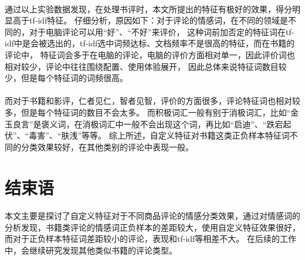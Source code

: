 \documentclass[a4paper,12pt]{article}
\begin{document}
\begin{CJK}{UTF8}{gbsn}
\begin{CJK}{UTF8}{gbsn}
\paragraph{}
通过以上实验数据发现，在处理书评时，本文所提出的特征有极好的效果，得分明显高于tf-idf特征。
仔细分析，原因如下：对于评论的情感词，在不同的领域是不同的，对于电脑评论可以用“好”、“不好”来评价，
这种词前加否定的特征词在tf-idf中是会被选出的，tf-idf选中词频达标、文档频率不是很高的特征，而在书籍的评论中，
特征词会多于在电脑的评论，电脑的评价方面相对单一，因此评价词也相对较少，评论中往往围绕配置、使用体验展开，
因此总体来说特征词数目较少，但是每个特征词的词频很高。
\paragraph{}
而对于书籍和影评，仁者见仁，智者见智，评价的方面很多，评论特征词也相对较多，但是每个特征词的数目不会太多。
而积极词汇一般有别于消极词汇，比如“金玉良言”是褒义词，在消极词汇中一般不会出现这个词，再比如“启迪”、“跌宕起伏”、“毒害”、“肤浅”等等。
综上所述，自定义特征对书籍这类正负样本特征词不同的分类效果较好，在其他类别的评论中表现一般。
\section{结束语}
\paragraph{}
本文主要是探讨了自定义特征对于不同商品评论的情感分类效果，通过对情感词的分析发现，书籍类评论的情感词正负样本的差距较大，使用自定义特征效果很好，而对于正负样本特征词差距较小的评论，表现和tf-idf等相差不大。
在后续的工作中，会继续研究发现其他类似书籍的评论类型。
\end{CJK}
\end{CJK}
\end{document}
